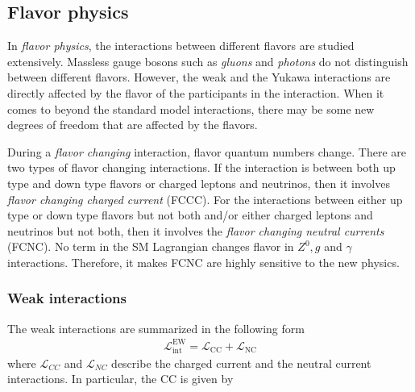 \subsection{Flavor physics}
In \textit{flavor physics}, the interactions between different flavors are studied extensively. Massless gauge bosons such as \textit{gluons} and \textit{photons} do not distinguish between different flavors. However, the weak and the Yukawa interactions are directly affected by the flavor of the participants in the interaction. When it comes to beyond the standard model interactions, there may be some new degrees of freedom that are affected by the flavors.\par
During a \textit{flavor changing} interaction, flavor quantum numbers change. There are two types of flavor changing interactions. If the interaction is between both up type and down type flavors or charged leptons and neutrinos, then it involves \textit{flavor changing charged current} (FCCC). For the interactions between either up type or down type flavors but not both and/or either charged leptons and neutrinos but not both, then it involves the \textit{flavor changing neutral currents} (FCNC). No term in the SM Lagrangian changes flavor in $Z^0, g$ and $\gamma$ interactions. Therefore, it makes FCNC are highly sensitive to the new physics.
\vspace{-0.5cm}
\subsubsection{Weak interactions}
\vspace{-0.3cm}
The weak interactions are summarized in the following form
\begin{eqnarray}
\mathcal{L}_{\mathrm{int}}^{\mathrm{EW}}=\mathcal{L}_{\mathrm{CC}}+\mathcal{L}_{\mathrm{NC}}
\end{eqnarray}
\vspace{-0.5cm}
where $\mathcal{L}_{CC}$ and $\mathcal{L}_{NC}$ describe the charged current and the neutral current interactions. In particular, the CC is given by \cite{Buras:1998raa}

